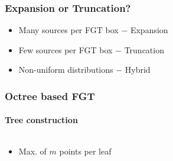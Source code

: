 
\begin{frame}
\frametitle{Expansion or Truncation?}
\begin{itemize}
\item Many sources per FGT box $-$ Expansion
\newline
\item Few sources per FGT box $-$ Truncation
\newline
\item Non-uniform distributions $-$ Hybrid
\end{itemize}
\end{frame}


\begin{frame}
\frametitle{Octree based FGT}
\framesubtitle{Tree construction}
\begin{columns}[T]
\begin{column}{0.4\textwidth}
\begin{itemize}
\item Max. of $m$ points per leaf
\end{itemize}
\end{column}
\begin{column}{0.6\textwidth}
 {

}
 {

}
 {

}
\end{column}
\end{columns}
\end{frame}


